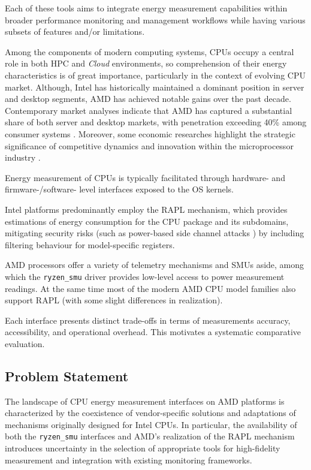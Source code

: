 Each of these tools aims to integrate energy measurement capabilities within
broader performance monitoring and management workflows while having various
subsets of features and/or limitations.

Among the components of modern computing systems, \gls{CPU}s occupy a central
role in both \gls{HPC} and \emph{Cloud} environments, so comprehension
of their energy characteristics is of great importance, particularly
in the context of evolving \gls{CPU} market. Although, Intel has historically
maintained a dominant position in server and desktop segments, AMD has
achieved notable gains over the past decade. Contemporary market analyses
indicate that AMD has captured a substantial share of both server and
desktop markets, with penetration exceeding 40\% among consumer systems
\parencite{NetworkWorld2025_Q1ServerShare}. Moreover, some economic researches
highlight the strategic significance of competitive dynamics
and innovation within the microprocessor industry
\parencite{GoettlerGordon2009_Competition}.

Energy measurement of \gls{CPU}s is typically facilitated through hardware- and
firmware-/software- level interfaces exposed to the \gls{OS} kernels.

Intel platforms predominantly employ the \gls{RAPL} mechanism, which provides
estimations of energy consumption for the \gls{CPU} package and its subdomains,
mitigating security risks (such as power-based side channel attacks
\parencite{PwrLeak_2023}) by including filtering behaviour for model-specific
registers.\parencite{IntelRAPL}

AMD processors offer a variety of telemetry mechanisms and \gls{SMU}s aside,
among which the \texttt{ryzen\_smu} \parencite{RyzenSMU_GitHub} driver provides
low-level access to power measurement readings. At the same time most of the
modern AMD \gls{CPU} model families also support \gls{RAPL} (with some slight
differences in realization).

Each interface presents distinct trade-offs in terms of measurements
accuracy, accessibility, and operational overhead. This motivates a
systematic comparative evaluation.

\subsection{Problem Statement}

The landscape of \gls{CPU} energy measurement interfaces on AMD platforms is
characterized by the coexistence of vendor-specific solutions and
adaptations of mechanisms originally designed for Intel \gls{CPU}s. In
particular, the availability of both the \texttt{ryzen\_smu} interfaces
and AMD's realization of the \gls{RAPL} mechanism introduces uncertainty in the
selection of appropriate tools for high-fidelity measurement and
integration with existing monitoring frameworks.

